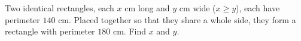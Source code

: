 Two identical rectangles, each $x$ cm long and $y$ cm wide ($x\ge y$), each have perimeter $140$ cm. Placed together so that they share a whole side, they form a rectangle with perimeter $180$ cm. Find $x$ and $y$.
